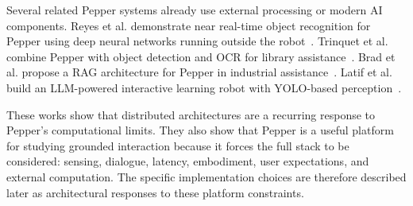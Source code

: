 Several related Pepper systems already use external processing or modern AI components. Reyes et al. demonstrate near real-time object recognition for Pepper using deep neural networks running outside the robot~\cite{reyes_near_2018}. Trinquet et al. combine Pepper with object detection and OCR for library assistance~\cite{trinquet_future_2025}. Brad et al. propose a RAG architecture for Pepper in industrial assistance~\cite{brad_retrieval-augmented_2025}. Latif et al. build an LLM-powered interactive learning robot with YOLO-based perception~\cite{latif_physicsassistant_2024}.

These works show that distributed architectures are a recurring response to Pepper's computational limits. They also show that Pepper is a useful platform for studying grounded interaction because it forces the full stack to be considered: sensing, dialogue, latency, embodiment, user expectations, and external computation. The specific implementation choices are therefore described later as architectural responses to these platform constraints.





